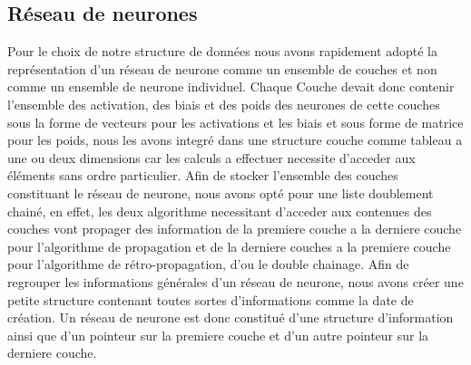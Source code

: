 \documentclass{article}
\begin{document}
	\subsection{Réseau de neurones}
	Pour le choix de notre structure de données nous avons rapidement adopté la représentation d'un réseau de neurone comme un ensemble de couches et non comme un ensemble de neurone individuel. Chaque Couche devait donc contenir l'ensemble des activation, des biais et des poids des neurones de cette couches sous la forme de vecteurs pour les activations et les biais et sous forme de matrice pour les poids, nous les avons integré dans une structure couche comme tableau a une ou deux dimensions car les calculs a effectuer necessite d'acceder aux éléments sans ordre particulier.	
	Afin de stocker l'ensemble des couches constituant le réseau de neurone, nous avons opté pour une liste doublement chainé, en effet, les deux algorithme necessitant d'acceder aux contenues des couches vont propager des information de la premiere couche a la derniere couche pour l'algorithme de propagation et de la derniere couches a la premiere couche pour l'algorithme de rétro-propagation, d'ou le double chainage.	
	Afin de regrouper les informations générales d'un réseau de neurone, nous avons créer une petite structure contenant toutes sortes d'informations comme la date de création.	
	Un réseau de neurone est donc constitué d'une structure d'information ainsi que d'un pointeur sur la premiere couche et d'un autre pointeur sur la derniere couche.
\end{document}
